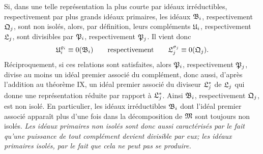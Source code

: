 Si, dans une telle représentation la plus courte par idéaux irréductibles, respectivement par plus grands idéaux primaires, les idéaux $\mathfrak{B}_i$, respectivement $\mathfrak{Q}_j$, sont non isolés, alors, par définition, leurs compléments $\mathfrak{U}_i$, respectivement $\mathfrak{L}_j$, sont divisibles par $\mathfrak{P}_i$, respectivement $\mathfrak{P}_j$. Il vient donc
\[
 \mathfrak{U}_i^{\varrho_i}\equiv0(\mathfrak{B}_i)
 \qquad \text{respectivement} \qquad
 \mathfrak{L}_j^{\sigma_j}\equiv0(\mathfrak{Q}_j).
\]
Réciproquement, si ces relations sont satisfaites, alors $\mathfrak{P}_i$, respectivement $\mathfrak{P}_j$, divise au moins un idéal premier associé du complément, donc aussi, d'après l'addition au théorème IX, un idéal premier associé du diviseur $\mathfrak{L}_j^*$ de $\mathfrak{L}_j$ qui donne une représentation réduite par rapport à $\mathfrak{L}_j^*$. Ainsi $\mathfrak{B}_i$, respectivement $\mathfrak{Q}_j$, est non isolé. En particulier, les idéaux irréductibles $\mathfrak{B}_i$ dont l'idéal premier associé apparaît plus d'une fois dans la décomposition de $\mathfrak{M}$ sont toujours non isolés. \emph{Les idéaux primaires non isolés sont donc aussi caractérisés par le fait qu'une puissance de tout complément devient divisible par eux; les idéaux primaires isolés, par le fait que cela ne peut pas se produire.}
